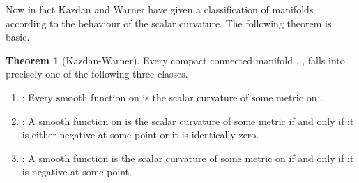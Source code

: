 \documentclass[a4paper,12pt]{article}
\theoremstyle{definition}
\newtheorem{thm}{Theorem}
\renewcommand{\-}{\myHighlight{$\dfrac{\quad\enspace}{\quad}$}\coordHE{}}
\begin{document}
Now in fact Kazdan and Warner \cite{7} have given a classification of manifolds according to the behaviour of the scalar curvature. The following theorem is basic.
\begin{thm}[Kazdan-Warner]
Every compact connected manifold \coordHE{}, \coordHE{}, falls into precisely one of the following  three classes.
\begin{enumerate}
\item {}\coordHE{} : Every smooth function on \coordHE{} is the scalar curvature of some metric on \coordHE{}.
\item {}\coordHE{} : A smooth function on \coordHE{} is the scalar curvature of some metric if and only if it is either negative at some point or it is identically zero.
\item {}\coordHE{} : A smooth function is the scalar curvature of some metric on \coordHE{} if and only if it is negative at some point.
\end{enumerate}
\end{thm}
\end{document}
